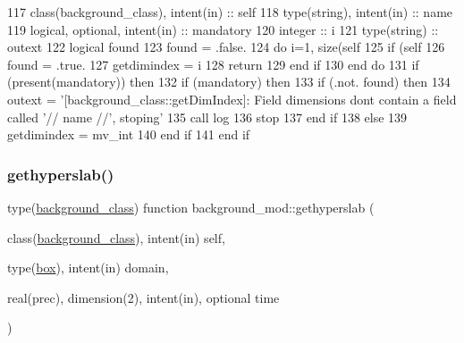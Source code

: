 \begin{DoxyCode}
117     \textcolor{keywordtype}{class}(background\_class), \textcolor{keywordtype}{intent(in)} :: self
118     \textcolor{keywordtype}{type}(string), \textcolor{keywordtype}{intent(in)} :: name
119     \textcolor{keywordtype}{logical}, \textcolor{keywordtype}{optional}, \textcolor{keywordtype}{intent(in)} :: mandatory
120     \textcolor{keywordtype}{integer} :: i
121     \textcolor{keywordtype}{type}(string) :: outext
122     \textcolor{keywordtype}{logical} found
123     found = .false.
124     \textcolor{keywordflow}{do} i=1, \textcolor{keyword}{size}(self%
125         \textcolor{keywordflow}{if} (self%
126             found = .true.
127             getdimindex = i
128             \textcolor{keywordflow}{return}
129 \textcolor{keywordflow}{        end if}
130 \textcolor{keywordflow}{    end do}
131     \textcolor{keywordflow}{if} (\textcolor{keyword}{present}(mandatory)) \textcolor{keywordflow}{then}
132         \textcolor{keywordflow}{if} (mandatory) \textcolor{keywordflow}{then}
133             \textcolor{keywordflow}{if} (.not. found) \textcolor{keywordflow}{then}
134                 outext = \textcolor{stringliteral}{'[background\_class::getDimIndex]: Field dimensions dont contain a field called '}//
       name //\textcolor{stringliteral}{', stoping'}
135                 \textcolor{keyword}{call }log%
136                 stop
137 \textcolor{keywordflow}{            end if}
138         \textcolor{keywordflow}{else}
139             getdimindex = mv\_int
140 \textcolor{keywordflow}{        end if}
141 \textcolor{keywordflow}{    end if}
\end{DoxyCode}
\mbox{\label{namespacebackground__mod_ae26fda3baab915148ec5749d1eda2ea6}} 
\subsubsection{\texorpdfstring{gethyperslab()}{gethyperslab()}}
{\footnotesize\ttfamily type(\mbox{\hyperlink{structbackground__mod_1_1background__class}{background\+\_\+class}}) function background\+\_\+mod\+::gethyperslab (\begin{DoxyParamCaption}\item[{class(\mbox{\hyperlink{structbackground__mod_1_1background__class}{background\+\_\+class}}), intent(in)}]{self,  }\item[{type(\mbox{\hyperlink{structgeometry__mod_1_1box}{box}}), intent(in)}]{domain,  }\item[{real(prec), dimension(2), intent(in), optional}]{time }\end{DoxyParamCaption})\hspace{0.3cm}{\ttfamily [private]}}



